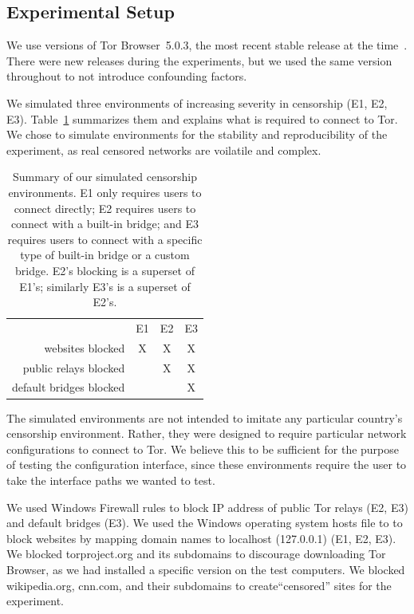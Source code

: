 \documentclass[USenglish,oneside,twocolumn]{article}
\begin{document}
\subsection{Experimental Setup}
\label{sec:environments}
We use versions of Tor Browser~5.0.3, 
the most recent stable release at the time~\cite{torbrowser-503}.
There were new releases during the experiments, but
we used the same version throughout to not introduce
confounding factors.

We simulated three environments of increasing severity in censorship (E1, E2, E3).
Table~\ref{tab:environments} summarizes them and explains what is required to connect to Tor. We chose to 
simulate environments for the stability and reproducibility of the 
experiment, as real censored networks are voilatile and complex. 

\begin{table}[t]
\centering
\begin{tabular}{r c c c}
& E1 & E2 & E3 \\
websites blocked & X & X & X \\
public relays blocked & & X & X \\
default bridges blocked & & & X \\
\end{tabular}
\caption{
Summary of our simulated censorship environments.
E1 only requires users to connect directly;
E2 requires users to connect with a built-in bridge;
and E3 requires users to connect with a specific type of built-in bridge
or a custom bridge.
E2's blocking is a superset of E1's;
similarly E3's is a superset of E2's.
}
\label{tab:environments}
\end{table}

The simulated environments are not intended to imitate any particular country's censorship environment. Rather, they were designed to require particular network configurations
to connect to Tor. We believe this to be sufficient for the purpose of testing the configuration interface, since these environments require the user to take the interface paths we wanted to test. 

We used Windows Firewall rules to block IP address of public Tor relays (E2, E3) and default bridges (E3). 
We used the Windows operating system hosts file to to block websites by
mapping domain names to localhost (127.0.0.1) (E1, E2, E3). We blocked torproject.org and its subdomains to discourage downloading Tor Browser, as we had installed a specific version on the test computers.  We blocked wikipedia.org, cnn.com, and their subdomains to create``censored'' sites for the experiment. 
\end{document}
